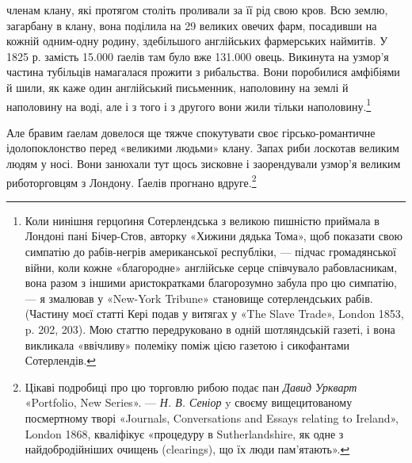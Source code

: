 членам клану, які протягом століть проливали за її рід свою кров.
Всю землю, загарбану в клану, вона поділила на 29 великих
овечих фарм, посадивши на кожній одним-одну родину, здебільшого
англійських фармерських наймитів. У 1825 р. замість
15.000 ґаелів там було вже 131.000 овець. Викинута на узмор’я
частина тубільців намагалася прожити з рибальства. Вони поробилися
амфібіями й шили, як каже один англійський письменник,
наполовину на землі й наполовину на воді, але і з того
і з другого вони жили тільки наполовину.\footnote{
Коли нинішня герцоґиня Сотерлендська з великою пишністю
приймала в Лондоні пані Бічер-Стов, авторку «Хижини дядька Тома»,
щоб показати свою симпатію до рабів-негрів американської республіки, —
підчас громадянської війни, коли кожне «благородне» англійське серце
співчувало рабовласникам, вона разом з іншими аристократками благорозумно
забула про цю симпатію, — я змалював у «New-York Tribune»
становище сотерлендських рабів. (Частину моєї статті Кері подав у витягах
у «The Slave Trade», London 1853, p. 202, 203). Мою статтю передруковано
в одній шотляндській газеті, і вона викликала «ввічливу» полеміку
поміж цією газетою і сикофантами Сотерлендів.
}

Але бравим ґаелам довелося ще тяжче спокутувати своє гірсько-романтичне
ідолопоклонство перед «великими людьми»
клану. Запах риби лоскотав великим людям у носі. Вони занюхали
тут щось зисковне і заорендували узмор’я великим риботорговцям
з Лондону. Ґаелів прогнано вдруге.\footnote{
Цікаві подробиці про цю торговлю рибою подає пан \emph{Давид Уркварт}
«Portfolio, New Series». — \emph{Н. В. Сеніор} y своєму вищецитованому посмертному
творі «Journals, Conversations and Essays relating to Ireland»,
London 1868, кваліфікує «процедуру в Sutherlandshire, як одне з найдобродійніших
очищень (clearings), що їх люди пам’ятають».
}

